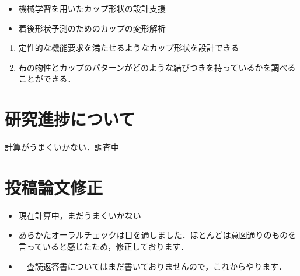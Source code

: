 \documentclass[11pt]{jsarticle}
\begin{document}
	\articleSPRabst
		\begin{itemize}
			\item 機械学習を用いたカップ形状の設計支援
			\item 着後形状予測のためのカップの変形解析
		\end{itemize}
		
		
	\articleSPRobj
		\begin{enumerate}
			\item 定性的な機能要求を満たせるようなカップ形状を設計できる
			\item 布の物性とカップのパターンがどのような結びつきを持っているかを調べることができる．
		\end{enumerate}
	\articleSPRitemsone
		
		\tableofcontents
		
		
	\articleSPRitemstwo
	\renewcommand{\labelitemi}{$\blacktriangledown$}
	\newcommand{\argmax}{\mathop{\rm arg~max}\limits}
	\newcommand{\argmin}{\mathop{\rm arg~min}\limits}
	\section{研究進捗について}
		計算がうまくいかない．調査中
	\section{投稿論文修正}
		\begin{itemize}
			\item 現在計算中，まだうまくいかない
			\item あらかたオーラルチェックは目を通しました．ほとんどは意図通りのものを言っていると感じたため，修正しております．
			\item　査読返答書についてはまだ書いておりませんので，これからやります．
		\end{itemize}
\end{document}
